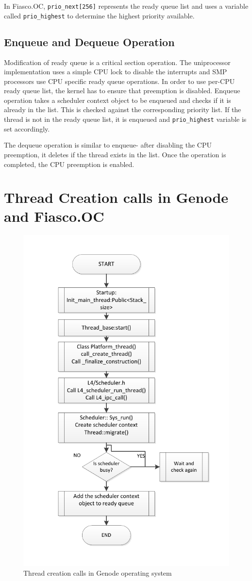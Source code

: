 In Fiasco.OC, \texttt{prio\_next[256]} represents the ready queue list and uses a variable called \texttt{prio\_highest} to determine the highest priority available.  

\subsection{Enqueue and Dequeue Operation}	
Modification of ready queue is a critical section operation. The uniprocessor implementation uses a simple CPU lock to disable the interrupts and SMP processors use CPU specific ready queue operations. In order to use per-CPU ready queue list, the kernel has to ensure that preemption is disabled. Enqueue operation takes a scheduler context object to be enqueued and checks if it is already in the list. This is checked against the corresponding priority list. If the thread is not in the ready queue list, it is enqueued and \texttt{prio\_highest} variable is set accordingly. 

The dequeue operation is similar to enqueue- after disabling the CPU preemption, it deletes if the thread exists in the list. Once the operation is completed, the CPU preemption is enabled.

\section{Thread Creation calls in Genode and Fiasco.OC}\label{foundations:thread_creation}

\begin{figure}[h]
\centering
\includegraphics[width=0.7\linewidth]{figures/Thread_creation}
\caption{Thread creation calls in Genode operating system}
\label{fig:Thread_creation}
\end{figure}

